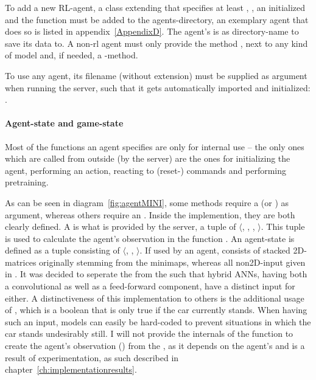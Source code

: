 To add a new RL-agent, a class extending  that specifies at least , , an initialized  and the function  must be added to the agents-directory, an exemplary agent that does so is listed in appendix~\ref{AppendixD}. The agent's  is as directory-name to save its data to. A non-rl agent must only provide the method , next to any kind of model and, if needed, a -method.

To use any agent, its filename (without extension) must be supplied as argument when running the server, such that it gets automatically imported and initialized: .

\paragraph{Agent-state and game-state}

Most of the functions an agent specifies are only for internal use -- the only ones which are called from outside (by the server) are the ones for initializing the agent, performing an action, reacting to (reset-) commands and performing pretraining.

As can be seen in diagram~\ref{fig:agentMINI}, some methods require a  (or ) as argument, whereas others require an . Inside the implemention, they are both clearly defined. A  is what is provided by the server, a tuple of $\langle$, , , $\rangle$. This tuple is used to calculate the agent's observation in the function . An agent-state is defined as a tuple consisting of $\langle$, , $\rangle$. If used by an agent,  consists of stacked 2D-matrices originally stemming from the minimaps, whereas all non2D-input given in . It was decided to seperate the  from the  such that hybrid ANNs, having both a convolutional as well as a feed-forward component, have a distinct input for either. A distinctiveness of this implementation to others is the additional usage of , which is a boolean that is only true if the car currently stands. When having such an input, models can easily be hard-coded to prevent situations in which the car stands undesirably still. I will not provide the internals of the function to create the agent's observation () from the , as it depends on the agent's  and is a result of experimentation, as such described in chapter~\ref{ch:implementationresults}.

